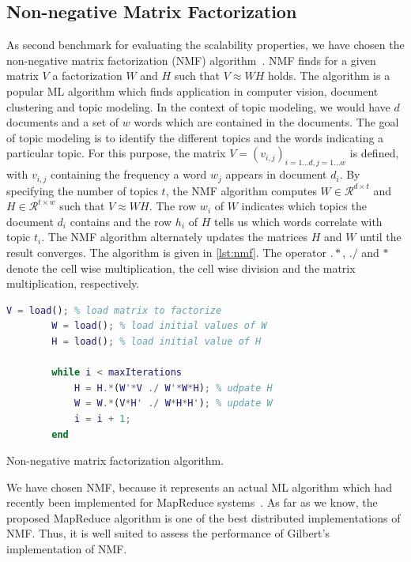 \subsection{Non-negative Matrix Factorization}

As second benchmark for evaluating the scalability properties, we have chosen the non-negative matrix factorization (NMF) algorithm~\cite{seung:anips2001a}.
NMF finds for a given matrix $V$ a factorization $W$ and $H$ such that $V\approx W H$ holds.
The algorithm is a popular ML algorithm which finds application in computer vision, document clustering and topic modeling.
In the context of topic modeling, we would have $d$ documents and a set of $w$ words which are contained in the documents.
The goal of topic modeling is to identify the different topics and the words indicating a particular topic.
For this purpose, the matrix $V = (v_{i,j})_{i=1\ldots d,j=1\ldots w}$ is defined, with $v_{i,j}$ containing the frequency a word $w_j$ appears in document $d_i$.
By specifying the number of topics $t$, the NMF algorithm computes $W\in \mathcal{R}^{d\times t}$ and $H\in \mathcal{R}^{t\times w}$ such that $V \approx W H$.
The row $w_i$ of $W$ indicates which topics the document $d_i$ contains and the row $h_i$ of $H$ tells us which words correlate with topic $t_i$.
The NMF algorithm alternately updates the matrices $H$ and $W$ until the result converges.
The algorithm is given in \cref{lst:nmf}.
The operator $.*$, $./$ and $*$ denote the cell wise multiplication, the cell wise division and the matrix multiplication, respectively.

\begin{listing}[!h]
	\begin{CenteredBox}
		\begin{lstlisting}[language=Matlab]
		V = load(); % load matrix to factorize
		W = load(); % load initial values of W
		H = load(); % load initial value of H

		while i < maxIterations
			H = H.*(W'*V ./ W'*W*H); % udpate H
			W = W.*(V*H' ./ W*H*H'); % update W
			i = i + 1;
		end
		\end{lstlisting}
	\end{CenteredBox}
	\caption{Non-negative matrix factorization algorithm.}
	\label{lst:nmf}
\end{listing}

We have chosen NMF, because it represents an actual ML algorithm which had recently been implemented for MapReduce systems~\cite{liu:2010a}.
As far as we know, the proposed MapReduce algorithm is one of the best distributed implementations of NMF.
Thus, it is well suited to assess the performance of Gilbert's implementation of NMF.


